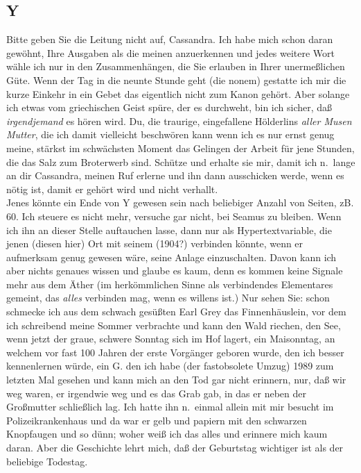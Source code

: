 \documentclass[
]{article}
\author{}
\date{\vspace{-2.5em}}
\begin{document}
\subsection{Y}\label{y}

Bitte geben Sie die Leitung nicht auf, Cassandra. Ich habe mich schon
daran gewöhnt, Ihre Ausgaben als die meinen anzuerkennen und jedes
weitere Wort wähle ich nur in den Zusammenhängen, die Sie erlauben in
Ihrer unermeßlichen Güte. Wenn der Tag in die neunte Stunde geht (die
nonem) gestatte ich mir die kurze Einkehr in ein Gebet das eigentlich
nicht zum Kanon gehört. Aber solange ich etwas vom griechischen Geist
spüre, der es durchweht, bin ich sicher, daß \emph{irgendjemand} es
hören wird. Du, die traurige, eingefallene Hölderlins \emph{aller Musen
Mutter}, die ich damit vielleicht beschwören kann wenn ich es nur ernst
genug meine, stärkst im schwächsten Moment das Gelingen der Arbeit für
jene Stunden, die das Salz zum Broterwerb sind. Schütze und erhalte sie
mir, damit ich n.~lange an dir Cassandra, meinen Ruf erlerne und ihn
dann ausschicken werde, wenn es nötig ist, damit er gehört wird und
nicht verhallt.\\
Jenes könnte ein Ende von Y gewesen sein nach beliebiger Anzahl von
Seiten, zB. 60. Ich steuere es nicht mehr, versuche gar nicht, bei
Seamus zu bleiben. Wenn ich ihn an dieser Stelle auftauchen lasse, dann
nur als Hypertextvariable, die jenen (diesen hier) Ort mit seinem
(1904?) verbinden könnte, wenn er aufmerksam genug gewesen wäre, seine
Anlage einzuschalten. Davon kann ich aber nichts genaues wissen und
glaube es kaum, denn es kommen keine Signale mehr aus dem Äther (im
herkömmlichen Sinne als verbindendes Elementares gemeint, das
\emph{alles} verbinden mag, wenn es willens ist.) Nur sehen Sie: schon
schmecke ich aus dem schwach gesüßten Earl Grey das Finnenhäuslein, vor
dem ich schreibend meine Sommer verbrachte und kann den Wald riechen,
den See, wenn jetzt der graue, schwere Sonntag sich im Hof lagert, ein
Maisonntag, an welchem vor fast 100 Jahren der erste Vorgänger geboren
wurde, den ich besser kennenlernen würde, ein G. den ich habe (der
fastobsolete Umzug) 1989 zum letzten Mal gesehen und kann mich an den
Tod gar nicht erinnern, nur, daß wir weg waren, er irgendwie weg und es
das Grab gab, in das er neben der Großmutter schließlich lag. Ich hatte
ihn n.~einmal allein mit mir besucht im Polizeikrankenhaus und da war er
gelb und papiern mit den schwarzen Knopfaugen und so dünn; woher weiß
ich das alles und erinnere mich kaum daran. Aber die Geschichte lehrt
mich, daß der Geburtstag wichtiger ist als der beliebige Todestag.\\
\end{document}
